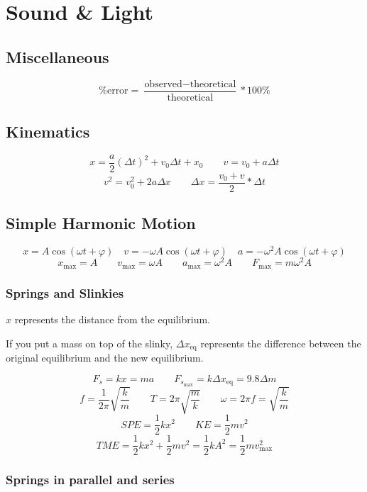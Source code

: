 \chapter{Sound \& Light}

\section{Miscellaneous}

\[
	\text{\% error} = \frac{\text{observed} - \text{theoretical}}{\text{theoretical}} * 100\%
\]

\section{Kinematics}

\[
	x = \frac{a}{2}(\Delta t)^2 + v_0\Delta t + x_0 \qquad
	v = v_0 + a\Delta t
\]\[
	v^2 = v_0^2 + 2a\Delta x \qquad
	\Delta x = \frac{v_0 + v}{2} * \Delta t
\]

\section{Simple Harmonic Motion}

\[
	x = A \cos(\omega t + \varphi) \quad
	v = -\omega A \cos(\omega t + \varphi) \quad
	a = -\omega^2 A \cos(\omega t + \varphi)
\]
\[
	x_{\max} = A \qquad
	v_{\max} = \omega A \qquad
	a_{\max} = \omega^2 A \qquad
	F_{\max} = m\omega^2 A
\]

\subsection{Springs and Slinkies}

$x$ represents the distance from the equilibrium.

If you put a mass on top of the slinky, $\Delta x_\text{eq}$ represents the difference between the original equilibrium and the new equilibrium.

\[
	F_s = kx = ma \qquad
	F_{s_{\max}} = k\Delta x_\text{eq} = 9.8 \Delta m
\]
\[
	f = \frac{1}{2\pi}\sqrt{\frac{k}{m}} \qquad 
	T = 2\pi\sqrt{\frac{m}{k}} \qquad 
	\omega = 2\pi f = \sqrt{\frac{k}{m}}
\]
\[
	SPE = \frac{1}{2} kx^2 \qquad
	KE = \frac{1}{2} mv^2
\]
\[
	TME = \frac{1}{2} kx^2 + \frac{1}{2} mv^2 = \frac{1}{2} kA^2 = \frac{1}{2} mv_{\max}^2
\]

\subsection{Springs in parallel and series}

